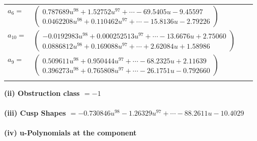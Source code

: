 \documentclass[1p]{elsarticle_modified}
\theoremstyle{definition}
\begin{document}
\begin{tabular}{m{7pt} m{180pt} m{7pt} m{180pt} }
\flushright $a_{6}=$&$\begin{pmatrix}0.787689 u^{98}+1.52752 u^{97}+\cdots-69.5405 u-9.45597\\0.0462208 u^{98}+0.110462 u^{97}+\cdots-15.8136 u-2.79226\end{pmatrix}$ \\
\flushright $a_{10}=$&$\begin{pmatrix}-0.0192983 u^{98}+0.000252513 u^{97}+\cdots-13.6676 u+2.75060\\0.0886812 u^{98}+0.169088 u^{97}+\cdots+2.62084 u+1.58986\end{pmatrix}$ \\
\flushright $a_{9}=$&$\begin{pmatrix}0.509611 u^{98}+0.950444 u^{97}+\cdots-68.2325 u+2.11639\\0.396273 u^{98}+0.765808 u^{97}+\cdots-26.1751 u-0.792660\end{pmatrix}$\\&\end{tabular}
\flushleft \textbf{(ii) Obstruction class $= -1$}\\~\\
\flushleft \textbf{(iii) Cusp Shapes $= -0.730846 u^{98}-1.26329 u^{97}+\cdots-88.2611 u-10.4029$}\\~\\
\newpage\renewcommand{\arraystretch}{1}
\flushleft \textbf{(iv) u-Polynomials at the component}\newline \\
\end{document}
